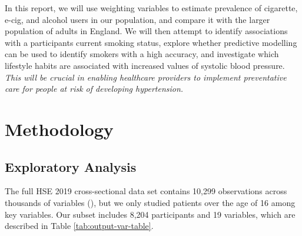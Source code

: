 \documentclass[
  11pt,
  twocolumn]{article}
\begin{document}
In this report, we will use weighting variables to estimate prevalence
of cigarette, e-cig, and alcohol users in our population, and compare it
with the larger population of adults in England. We will then attempt to
identify associations with a participants current smoking status,
explore whether predictive modelling can be used to identify smokers
with a high accuracy, and investigate which lifestyle habits are
associated with increased values of systolic blood pressure. \emph{This
will be crucial in enabling healthcare providers to implement
preventative care for people at risk of developing hypertension.}

\section{Methodology}\label{methodology}

\subsection{Exploratory Analysis}\label{exploratory-analysis}

The full HSE 2019 cross-sectional data set contains 10,299 observations
across thousands of variables (), but we only studied patients over the age of
16 among key variables. Our subset includes 8,204 participants and 19
variables, which are described in Table \ref{tab:output-var-table}.
\end{document}
